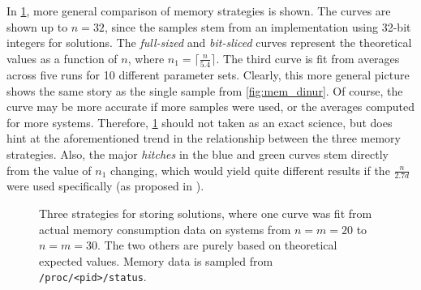 In \cref{fig:three_mem}, more general comparison of memory strategies is shown. The curves are shown up to $n = 32$, since the samples stem from an implementation using 32-bit integers for solutions. The \textit{full-sized} and \textit{bit-sliced} curves represent the theoretical values as a function of $n$, where $n_1 = \lceil \frac{n}{5.4} \rceil$. The third curve is fit from averages across five runs for 10 different parameter sets. Clearly, this more general picture shows the same story as the single sample from \cref{fig:mem_dinur}. Of course, the curve may be more accurate if more samples were used, or the averages computed for more systems. Therefore, \cref{fig:three_mem} should not taken as an exact science, but does hint at the aforementioned trend in the relationship between the three memory strategies. Also, the major \textit{hitches} in the blue and green curves stem directly from the value of $n_1$ changing, which would yield quite different results if the $\frac{n}{2.7d}$ were used specifically (as proposed in \cite{eurocrypt-2021-30841}).

\begin{figure}[t]
    \centering
    \caption{Three strategies for storing solutions, where one curve was fit from actual memory consumption data on systems from $n = m = 20$ to $n = m = 30$. The two others are purely based on theoretical expected values. Memory data is sampled from \texttt{/proc/<pid>/status}.} \label{fig:three_mem}
\end{figure}

